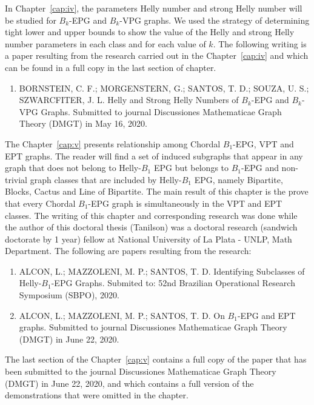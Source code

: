 In Chapter~\ref{cap:iv}, the parameters Helly number and strong Helly number will be studied for  $ B_k$-EPG and $ B_k$-VPG graphs. We used the strategy of determining tight lower and upper bounds to show the value of the Helly and strong Helly number parameters in each class and for each value of $k$. The following writing is a paper resulting from the research carried out in the Chapter~\ref{cap:iv} and which can be found in a full copy in the last section of chapter.

\begin{enumerate}
    \item BORNSTEIN, C. F.; MORGENSTERN, G.; SANTOS, T. D.; SOUZA, U. S.; SZWARCFITER, J. L.  Helly and Strong Helly Numbers of $B_k$-EPG and $B_k$-VPG Graphs. Submitted to journal Discussiones Mathematicae Graph Theory (DMGT) in  May 16, 2020. 
\end{enumerate}



The Chapter~\ref{cap:v} presents relationship among Chordal $B_1$-EPG, VPT and EPT graphs. The reader will find a set of induced subgraphs that appear in any graph that does not belong to Helly-$B_1$ EPG but belongs to $B_1$-EPG and non-trivial graph classes that are included by Helly-$B_1$ EPG, namely Bipartite, Blocks, Cactus and Line of Bipartite. The main result of this chapter is the prove that every Chordal $B_1$-EPG graph is simultaneously in the VPT and EPT classes.  The writing of this chapter and corresponding research was done while the author of this doctoral thesis (Tanilson) was a doctoral research (sandwich doctorate by 1 year) fellow at National University of La Plata - UNLP, Math Department. 
 The following are  papers resulting from the research:
 
 
 
\begin{enumerate}

     \item ALCON, L.; MAZZOLENI, M. P.;  SANTOS, T. D. Identifying Subclasses of Helly-$B_1$-EPG Graphs. Submited to: 52nd  Brazilian Operational Research Symposium (SBPO), 2020.
     
     \item ALCON, L.; MAZZOLENI, M. P.;  SANTOS, T. D. On $B_1$-EPG  and EPT graphs. Submitted to journal Discussiones Mathematicae Graph Theory (DMGT) in June 22, 2020.

\end{enumerate}

The last section of the Chapter~\ref{cap:v} contains a full copy of the paper that has been submitted to the  journal Discussiones Mathematicae Graph Theory (DMGT) in June 22, 2020, and which contains a full version of the demonstrations that were omitted in the chapter.


